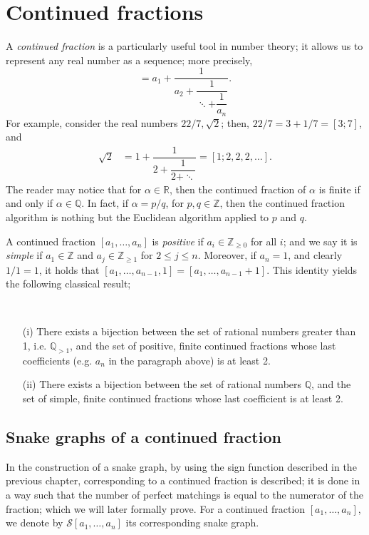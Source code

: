 \chapter{Continued fractions}
A \emph{continued fraction} is a particularly useful tool in number theory; it allows us to represent any real number as a sequence; more precisely, 
\begin{equation*}
    [a_1,a_2,\dots,a_n] = a_1 + \dfrac{1}{a_2+\dfrac{1}{\ddots + \dfrac{1}{a_n}}}.
\end{equation*}
For example, consider the real numbers $22/7,\sqrt{2}$; then, $22/7 = 3+1/7 = [3;7]$, and 
\begin{align*}
    \sqrt{2} &= 1 + \dfrac{1}{2+ \dfrac{1}{2 + \ddots}} = [1;2,2,2,\dots].
\end{align*}
The reader may notice that for $\alpha \in \mathbb{R}$, then the continued fraction of $\alpha$ is finite if and only if $\alpha \in \mathbb{Q}$. In fact, if $\alpha = p/q$, for $p,q \in \mathbb{Z}$, then the continued fraction algorithm is nothing but the Euclidean algorithm applied to $p$ and $q$. 

A continued fraction $[a_1,\dots,a_n]$ is \emph{positive} if $a_i \in \mathbb{Z}_{\geq 0}$ for all $i$; and we say it is \emph{simple} if $a_1 \in \mathbb{Z}$ and $a_j \in \mathbb{Z}_{\ge 1}$ for $2 \leq j \leq n$. Moreover, if $a_n = 1$, and clearly $1/1 = 1$, it holds that $[a_1,\dots,a_{n-1},1] = [a_1,\dots,a_{n-1}+1]$. This identity yields the following classical result;
\begin{theorem}\label{thm3.4}~ 
    \begin{itemize}
        \item[(i)] There exists a bijection between the set of rational numbers greater than 1, i.e. $\mathbb{Q}_{> 1}$, and the set of positive, finite continued fractions whose last coefficients (e.g. $a_n$ in the paragraph above) is at least 2. 
        \item[(ii)] There exists a bijection between the set of rational numbers $\mathbb{Q}$, and the set of simple, finite continued fractions whose last coefficient is at least 2. 
    \end{itemize}
\end{theorem}
\section{Snake graphs of a continued fraction}
In \cite{CS2} the construction of a snake graph, by using the sign function described in the previous chapter, corresponding to a continued fraction is described; it is done in a way such that the number of perfect matchings is equal to the numerator of the fraction; which we will later formally prove. For a continued fraction $[a_1,\dots,a_n]$, we denote by $\mathcal{S}[a_1,\dots,a_n]$ its corresponding snake graph. 

